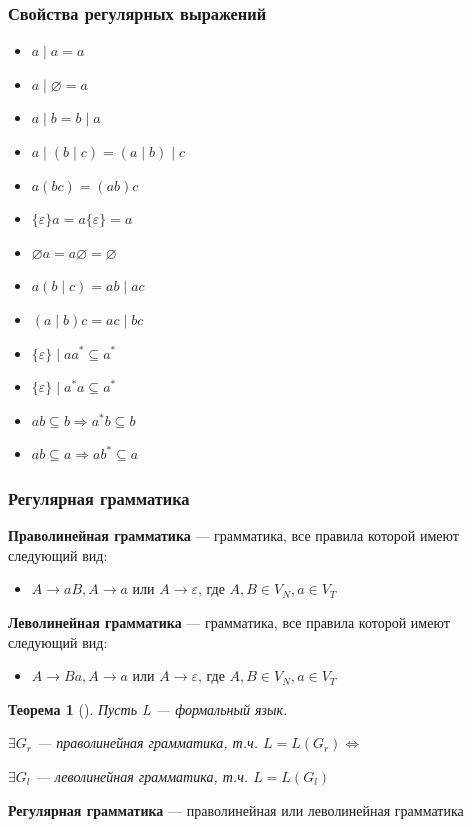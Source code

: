 \documentclass{beamer}
\newtheorem{rutheorem}{Теорема}
\begin{document}
\begin{frame}
  \transwipe[direction=90]
  \frametitle{Свойства регулярных выражений}
  \begin{itemize}
    \item $a \mid a = a$
    \item $a \mid \varnothing = a$
    \item $a \mid b = b \mid a$
    \item $a \mid (b \mid c) = (a \mid b) \mid c$
    \item $a(bc) = (ab)c$
    \item $\{\varepsilon \} a = a \{ \varepsilon \} = a $
    \item $\varnothing a = a \varnothing = \varnothing$
    \item $a (b\mid c) = ab \mid ac$
    \item $(a \mid b) c = ac \mid bc $
    \item $\{\varepsilon \} \mid aa^* \subseteq a^*$
    \item $\{\varepsilon \} \mid a^*a \subseteq a^*$
    \item $ab \subseteq b \Rightarrow a^* b \subseteq b$
    \item $ab \subseteq a \Rightarrow a b^* \subseteq a$
        
  \end{itemize}
\end{frame}



\begin{frame}[fragile]
  \transwipe[direction=90]
  \frametitle{Регулярная грамматика}
  \textbf{Праволинейная грамматика} --- грамматика, все правила которой имеют следующий вид:
  \begin{itemize}
    \item $A \to a B, A \to a \text{ или } A \to \varepsilon \text{, где } A, B \in V_N, a \in V_T$
  \end{itemize}


  \textbf{Леволинейная грамматика} --- грамматика, все правила которой имеют следующий вид:
  \begin{itemize}
    \item $A \to B a, A \to a \text{ или } A \to \varepsilon \text{, где } A, B \in V_N, a \in V_T$
  \end{itemize}

\pause 

  \begin{rutheorem}[]
    Пусть L --- формальный язык. 

    $\exists G_r$ --- праволинейная грамматика, т.ч. $L = L(G_r) \Leftrightarrow$ 
    
    $\exists G_l$ --- леволинейная грамматика, т.ч. $L = L(G_l) $
  \end{rutheorem}
\pause
  \textbf{Регулярная грамматика} --- праволинейная или леволинейная грамматика
\end{frame}
\end{document}
